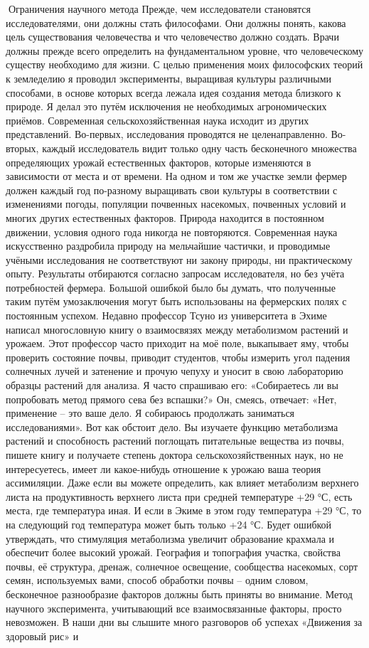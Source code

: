 \documentclass[a4paper]{book}
\begin{document}
Ограничения научного метода
Прежде, чем исследователи становятся исследователями, они должны стать
философами. Они должны понять, какова цель существования человечества и что
человечество должно создать. Врачи должны прежде всего определить на фундаментальном
уровне, что человеческому существу необходимо для жизни.
С целью применения моих философских теорий к земледелию я проводил
эксперименты, выращивая культуры различными способами, в основе которых всегда лежала
идея создания метода близкого к природе. Я делал это путём исключения не необходимых
агрономических приёмов.
Современная сельскохозяйственная наука исходит из других представлений. Во-первых,
исследования проводятся не целенаправленно. Во-вторых, каждый исследователь видит
только одну часть бесконечного множества определяющих урожай естественных факторов,
которые изменяются в зависимости от места и от времени.
На одном и том же участке земли фермер должен каждый год по-разному выращивать
свои культуры в соответствии с изменениями погоды, популяции почвенных насекомых,
почвенных условий и многих других естественных факторов. Природа находится в
постоянном движении, условия одного года никогда не повторяются.
Современная наука искусственно раздробила природу на мельчайшие частички, и
проводимые учёными исследования не соответствуют ни закону природы, ни практическому
опыту. Результаты отбираются согласно запросам исследователя, но без учёта потребностей
фермера. Большой ошибкой было бы думать, что полученные таким путём умозаключения
могут быть использованы на фермерских полях с постоянным успехом.
Недавно профессор Тсуно из университета в Эхиме написал многословную книгу о
взаимосвязях между метаболизмом растений и урожаем. Этот профессор часто приходит на
моё поле, выкапывает яму, чтобы проверить состояние почвы, приводит студентов, чтобы
измерить угол падения солнечных лучей и затенение и прочую чепуху и уносит в свою
лабораторию образцы растений для анализа. Я часто спрашиваю его: «Собираетесь ли вы
попробовать метод прямого сева без вспашки?» Он, смеясь, отвечает: «Нет, применение – это
ваше дело. Я собираюсь продолжать заниматься исследованиями».
Вот как обстоит дело. Вы изучаете функцию метаболизма растений и способность
растений поглощать питательные вещества из почвы, пишете книгу и получаете степень
доктора сельскохозяйственных наук, но не интересуетесь, имеет ли какое-нибудь отношение
к урожаю ваша теория ассимиляции.
Даже если вы можете определить, как влияет метаболизм верхнего листа на
продуктивность верхнего листа при средней температуре +29 °С, есть места, где температура
иная. И если в Экиме в этом году температура +29 °С, то на следующий год температура
может быть только +24 °С. Будет ошибкой утверждать, что стимуляция метаболизма
увеличит образование крахмала и обеспечит более высокий урожай. География и топография
участка, свойства почвы, её структура, дренаж, солнечное освещение, сообщества насекомых,
сорт семян, используемых вами, способ обработки почвы – одним словом, бесконечное
разнообразие факторов должны быть приняты во внимание. Метод научного эксперимента,
учитывающий все взаимосвязанные факторы, просто невозможен.
В наши дни вы слышите много разговоров об успехах «Движения за здоровый рис» и
\end{document}
